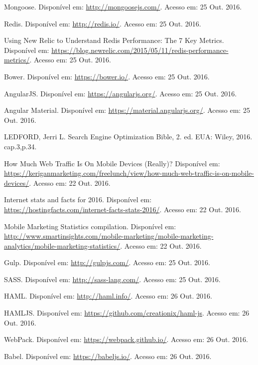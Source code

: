\documentclass[brazil,ruledheader]{abntifes}
\begin{document}
\begin{thebibliography}{9}
		Mongoose. Disponível em: \url{http://mongoosejs.com/}.
		Acesso em: 25 Out. 2016.
		
		Redis. Disponível em: \url{http://redis.io/}.
		Acesso em: 25 Out. 2016.
		
		Using New Relic to Understand Redis Performance: The 7 Key Metrics. Disponível em: \url{https://blog.newrelic.com/2015/05/11/redis-performance-metrics/}.
		Acesso em: 25 Out. 2016.
		
		Bower. Disponível em: \url{https://bower.io/}.
		Acesso em: 25 Out. 2016.
		
		AngularJS. Disponível em: \url{https://angularjs.org/}.
		Acesso em: 25 Out. 2016.
		
		Angular Material. Disponível em: \url{https://material.angularjs.org/}.
		Acesso em: 25 Out. 2016.
		
		LEDFORD, Jerri L. Search Engine Optimization Bible, 2. ed. EUA: Wiley,
		2016. cap.3,p.34.
		
		How Much Web Traffic Is On Mobile Devices (Really)? Disponível em: \url{https://keriganmarketing.com/freelunch/view/how-much-web-traffic-is-on-mobile-devices/}.
		Acesso em: 22 Out. 2016.
		
		Internet stats and facts for 2016. Disponível em: \url{https://hostingfacts.com/internet-facts-stats-2016/}.
		Acesso em: 22 Out. 2016.
		
		Mobile Marketing Statistics compilation. Disponível em: \url{http://www.smartinsights.com/mobile-marketing/mobile-marketing-analytics/mobile-marketing-statistics/}.
		Acesso em: 22 Out. 2016.
		
		Gulp. Disponível em: \url{http://gulpjs.com/}.
		Acesso em: 25 Out. 2016.
		
		SASS. Disponível em: \url{http://sass-lang.com/}.
		Acesso em: 25 Out. 2016.
		
		HAML. Disponível em: \url{http://haml.info/}.
		Acesso em: 26 Out. 2016.
		
		HAMLJS. Disponível em: \url{https://github.com/creationix/haml-js}.
		Acesso em: 26 Out. 2016.
		
		WebPack. Disponível em: \url{https://webpack.github.io/}.
		Acesso em: 26 Out. 2016.
		
		Babel. Disponível em: \url{https://babeljs.io/}.
		Acesso em: 26 Out. 2016.
		

\end{thebibliography}
\end{document}
